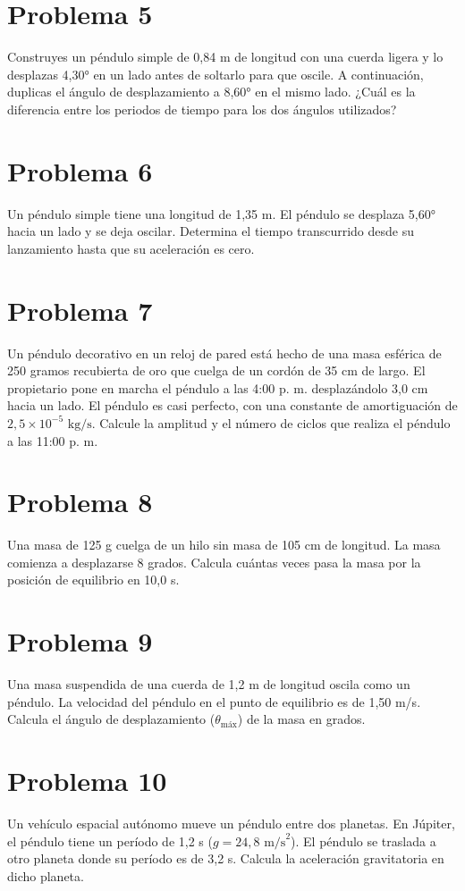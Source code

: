 \documentclass[10pt,a4paper]{article}
\begin{document}
\section*{Problema 5}
Construyes un péndulo simple de 0,84 m de longitud con una cuerda ligera y lo desplazas 4,30° en un lado antes de soltarlo para que oscile. A continuación, duplicas el ángulo de desplazamiento a 8,60° en el mismo lado. ¿Cuál es la diferencia entre los periodos de tiempo para los dos ángulos utilizados?
\vspace{6cm}
\section*{Problema 6}
Un péndulo simple tiene una longitud de 1,35 m. El péndulo se desplaza 5,60° hacia un lado y se deja oscilar. Determina el tiempo transcurrido desde su lanzamiento hasta que su aceleración es cero.
\vspace{6cm}
\section*{Problema 7}
Un péndulo decorativo en un reloj de pared está hecho de una masa esférica de 250 gramos recubierta de oro que cuelga de un cordón de 35 cm de largo. El propietario pone en marcha el péndulo a las 4:00 p. m. desplazándolo 3,0 cm hacia un lado. El péndulo es casi perfecto, con una constante de amortiguación de $2,5 \times 10^{-5} \text{ kg/s}$. Calcule la amplitud y el número de ciclos que realiza el péndulo a las 11:00 p. m.
\vspace{6cm}
\section*{Problema 8}
Una masa de 125 g cuelga de un hilo sin masa de 105 cm de longitud. La masa comienza a desplazarse 8 grados. Calcula cuántas veces pasa la masa por la posición de equilibrio en 10,0 s.
\vspace{6cm}
\section*{Problema 9}
Una masa suspendida de una cuerda de 1,2 m de longitud oscila como un péndulo. La velocidad del péndulo en el punto de equilibrio es de 1,50 m/s. Calcula el ángulo de desplazamiento ($\theta_{\text{máx}}$) de la masa en grados.
\vspace{6cm}
\section*{Problema 10}
Un vehículo espacial autónomo mueve un péndulo entre dos planetas. En Júpiter, el péndulo tiene un período de 1,2 s ($g = 24,8 \text{ m/s}^2$). El péndulo se traslada a otro planeta donde su período es de 3,2 s. Calcula la aceleración gravitatoria en dicho planeta.
\vspace{6cm}
\end{document}
